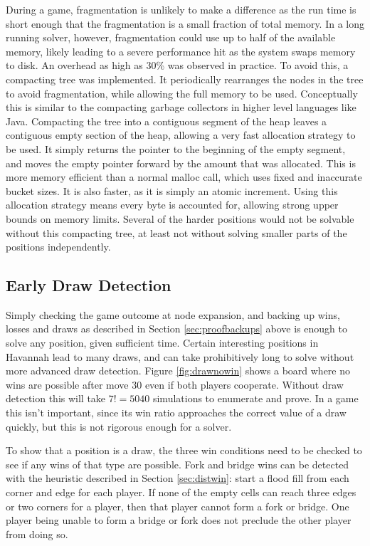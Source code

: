 During a game, fragmentation is unlikely to make a difference as the run time is short enough that the fragmentation is a small fraction of total memory. In a long running solver, however, fragmentation could use up to half of the available memory, likely leading to a severe performance hit as the system swaps memory to disk. An overhead as high as 30\% was observed in practice. To avoid this, a compacting tree was implemented. It periodically rearranges the nodes in the tree to avoid fragmentation, while allowing the full memory to be used. Conceptually this is similar to the compacting garbage collectors in higher level languages like Java. Compacting the tree into a contiguous segment of the heap leaves a contiguous empty section of the heap, allowing a very fast allocation strategy to be used. It simply returns the pointer to the beginning of the empty segment, and moves the empty pointer forward by the amount that was allocated. This is more memory efficient than a normal malloc call, which uses fixed and inaccurate bucket sizes. It is also faster, as it is simply an atomic increment. Using this allocation strategy means every byte is accounted for, allowing strong upper bounds on memory limits. Several of the harder positions would not be solvable without this compacting tree, at least not without solving smaller parts of the positions independently.

\subsection{Early Draw Detection}\label{sec:drawdetect}

Simply checking the game outcome at node expansion, and backing up wins, losses and draws as described in Section \ref{sec:proofbackups} above is enough to solve any position, given sufficient time. Certain interesting positions in Havannah lead to many draws, and can take prohibitively long to solve without more advanced draw detection. Figure \ref{fig:drawnowin} shows a board where no wins are possible after move 30 even if both players cooperate. Without draw detection this will take $7!=5040$ simulations to enumerate and prove. In a game this isn't important, since its win ratio approaches the correct value of a draw quickly, but this is not rigorous enough for a solver.

To show that a position is a draw, the three win conditions need to be checked to see if any wins of that type are possible. Fork and bridge wins can be detected with the heuristic described in Section \ref{sec:distwin}: start a flood fill from each corner and edge for each player. If none of the empty cells can reach three edges or two corners for a player, then that player cannot form a fork or bridge. One player being unable to form a bridge or fork does not preclude the other player from doing so.

